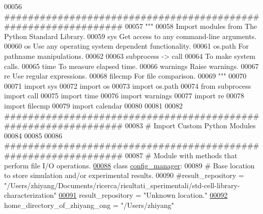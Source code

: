 \begin{DoxyCode}
00056 \textcolor{comment}{###############################################################}
00057 \textcolor{stringliteral}{"""}
00058 \textcolor{stringliteral}{    Import modules from The Python Standard Library.}
00059 \textcolor{stringliteral}{    sys         Get access to any command-line arguments.}
00060 \textcolor{stringliteral}{    os          Use any operating system dependent functionality.}
00061 \textcolor{stringliteral}{    os.path     For pathname manipulations.}
00062 \textcolor{stringliteral}{}
00063 \textcolor{stringliteral}{    subprocess -> call}
00064 \textcolor{stringliteral}{                To make system calls.}
00065 \textcolor{stringliteral}{    time        To measure elapsed time.}
00066 \textcolor{stringliteral}{    warnings    Raise warnings.}
00067 \textcolor{stringliteral}{    re          Use regular expressions.}
00068 \textcolor{stringliteral}{    filecmp     For file comparison.}
00069 \textcolor{stringliteral}{"""}
00070 
00071 \textcolor{keyword}{import} sys
00072 \textcolor{keyword}{import} os
00073 \textcolor{keyword}{import} os.path
00074 \textcolor{keyword}{from} subprocess \textcolor{keyword}{import} call
00075 \textcolor{keyword}{import} time
00076 \textcolor{keyword}{import} warnings
00077 \textcolor{keyword}{import} re
00078 \textcolor{keyword}{import} filecmp
00079 \textcolor{keyword}{import} calendar
00080 
00081 
00082 \textcolor{comment}{###############################################################}
00083 \textcolor{comment}{#   Import Custom Python Modules}
00084 
00085 
00086 \textcolor{comment}{###############################################################}
00087 \textcolor{comment}{#   Module with methods that perform file I/O operations.}
\hypertarget{configuration__manager_8py_source_l00088}{}\hyperlink{classutilities_1_1configuration__manager_1_1config__manager}{00088} \textcolor{keyword}{class }\hyperlink{classutilities_1_1configuration__manager_1_1config__manager}{config\_manager}:
00089     \textcolor{comment}{#   Base location to store simulation and/or experimental results.}
00090     \textcolor{comment}{#result\_repository =
       "/Users/zhiyang/Documents/ricerca/risultati\_sperimentali/std-cell-library-characterization"}
\hypertarget{configuration__manager_8py_source_l00091}{}\hyperlink{classutilities_1_1configuration__manager_1_1config__manager_a19ed9ae453acea0ed85f704f18ee4b30}{00091}     result\_repository = \textcolor{stringliteral}{"Unknown location."}
\hypertarget{configuration__manager_8py_source_l00092}{}\hyperlink{classutilities_1_1configuration__manager_1_1config__manager_a884c4ec67676c35cc6fd674c208abfe2}{00092}     home\_directory\_of\_zhiyang\_ong = \textcolor{stringliteral}{"/Users/zhiyang"}

\end{DoxyCode}

